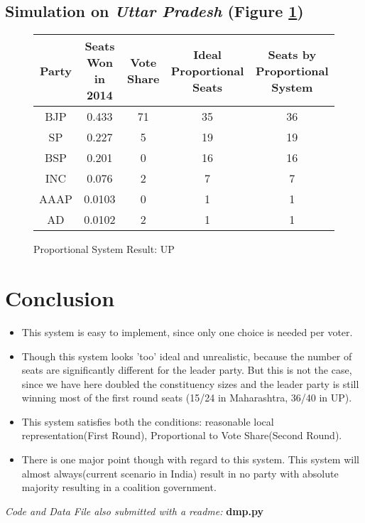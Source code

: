 \documentclass{article}
\begin{document}
\subsection{Simulation on \emph{Uttar Pradesh} (Figure \ref{up})}
\begin{figure}[h!]
\begin{center}
\begin{tabular}{|c|c|c|c|c|}
\hline
\textbf{Party} & \textbf{Seats Won in 2014} & \textbf{Vote Share} & \textbf{Ideal Proportional Seats} & \textbf{Seats by Proportional System}\\
\hline
BJP & 0.433 & 71 & 35 & 36\\
SP & 0.227 & 5 & 19 & 19\\
BSP & 0.201 & 0 & 16 & 16\\
INC & 0.076 & 2 & 7 & 7\\
AAAP & 0.0103& 0 & 1 & 1\\
AD & 0.0102 & 2 &1 & 1\\
\hline
\end{tabular}
\caption{Proportional System Result: UP}
\label{up}
\end{center}
\end{figure}

\section{Conclusion}
\begin{itemize}
\item This system is easy to implement, since only one choice is needed per voter.
\item Though this system looks 'too' ideal and unrealistic, because the number of seats are significantly different for the leader party. But this is not the case, since we have here doubled the constituency sizes and the leader party is still winning most of the first round seats (15/24 in Maharashtra, 36/40 in UP). 
\item This system satisfies both the conditions: reasonable local representation(First Round), Proportional to Vote Share(Second Round).
\item There is one major point though with regard to this system. This system will almost always(current scenario in India) result in no party with absolute majority resulting in a coalition government.
\end{itemize}

\emph{Code and Data File also submitted with a readme:} \textbf{dmp.py}
\end{document}
